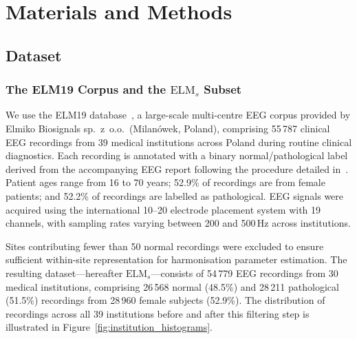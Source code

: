 \documentclass[preprint,12pt]{elsarticle}
\begin{document}
\section{Materials and Methods}
\label{sec:methods}

\subsection{Dataset}
\label{subsec:dataset}

\subsubsection{The ELM19 Corpus and the
  \texorpdfstring{$\mathrm{ELM}_s$}{ELMs} Subset}

We use the ELM19 database~\cite{poziomska2026quantity}, a large-scale
multi-centre EEG corpus provided by Elmiko Biosignals sp.~z~o.o.\
(Milanówek, Poland), comprising 55\,787 clinical EEG recordings from
39 medical institutions across Poland during routine clinical
diagnostics.
Each recording is annotated with a binary normal/pathological label
derived from the accompanying EEG report following the procedure
detailed in~\cite{poziomska2026quantity}.
Patient ages range from 16 to 70 years; 52.9\% of recordings are
from female patients; and 52.2\% of recordings are labelled as
pathological.
EEG signals were acquired using the international 10--20 electrode
placement system with 19 channels, with sampling rates varying
between 200 and 500\,Hz across institutions.

Sites contributing fewer than 50 normal recordings were excluded to
ensure sufficient within-site representation for harmonisation
parameter estimation.
The resulting dataset---hereafter $\mathrm{ELM}_s$---consists of
54\,779 EEG recordings from 30 medical institutions, comprising
26\,568 normal (48.5\%) and 28\,211 pathological (51.5\%) recordings
from 28\,960 female subjects (52.9\%).
The distribution of recordings across all 39 institutions before and
after this filtering step is illustrated in
Figure~\ref{fig:institution_histograms}.
\end{document}
